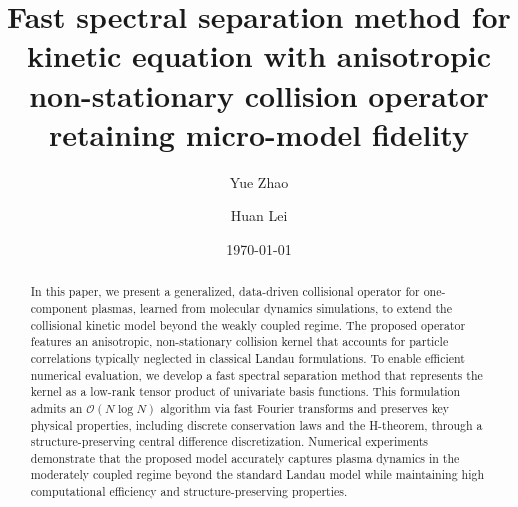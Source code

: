 \documentclass[preprint,1p,times]{elsarticle}
\newcommand{\cO}{\mathcal{O}}
\theoremstyle{definition}
\theoremstyle{remark}
\begin{document}
\begin{frontmatter}


\title{
Fast spectral separation method for kinetic equation with anisotropic non-stationary collision operator retaining micro-model fidelity \\
} %
\author[1]{Yue Zhao}
\address[1]{{Department of Computational Mathematics, Science \& Engineering, Michigan State University}, 428 S Shaw Ln, East Lansing 48824, MI, USA}
\author[1,2]{Huan Lei}
\address[2]{{Department of Statistics \& Probability, Michigan State University}, 619 Red Cedar Road Wells Hall, East Lansing 48824, MI, USA}

\date{\today}


\begin{abstract}
In this paper, we present a generalized, data-driven collisional operator for one-component plasmas, learned from molecular dynamics simulations, to extend the collisional kinetic model beyond the weakly coupled regime.
The proposed operator features an anisotropic, non-stationary collision kernel that accounts for particle correlations typically neglected in classical Landau formulations.
To enable efficient numerical evaluation, we develop a fast spectral separation method that represents the kernel as a low-rank tensor product of univariate basis functions. 
This formulation admits an $\cO(N \log N)$ algorithm via fast Fourier transforms and preserves key physical properties, including discrete conservation laws and the H-theorem, through a structure-preserving central difference discretization. 
Numerical experiments demonstrate that the proposed model accurately captures plasma dynamics in the moderately coupled regime beyond the standard Landau model while maintaining high computational efficiency and structure-preserving properties.

\end{abstract}


\end{frontmatter}
\end{document}
